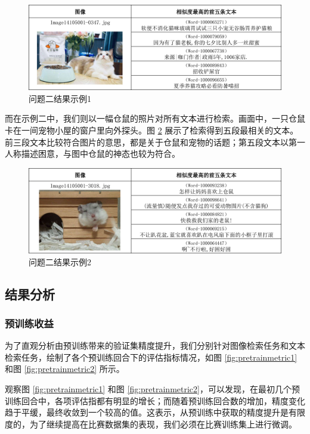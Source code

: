 \documentclass[a4paper]{zreport}
\begin{document}
\begin{figure}[h]
\centering
\includegraphics[width=1.\linewidth]{figures/example21}
\caption{问题二结果示例1}
\label{fig:example21}
\end{figure}

而在示例二中，我们则以一幅仓鼠的照片对所有文本进行检索。画面中，一只仓鼠卡在一间宠物小屋的窗户里向外探头。图 \ref{fig:example22} 展示了检索得到五段最相关的文本。前三段文本比较符合图片的意思，都是关于仓鼠和宠物的话题；第五段文本以第一人称描述困意，与图中仓鼠的神态也较为符合。


\begin{figure}[h]
\centering
\includegraphics[width=1.\linewidth]{figures/example22}
\caption{问题二结果示例2}
\label{fig:example22}
\end{figure}


\subsection{结果分析}

\subsubsection{预训练收益}

为了直观分析由预训练带来的验证集精度提升，我们分别针对图像检索任务和文本检索任务，绘制了各个预训练回合下的评估指标情况，如图 \ref{fig:pretrainmetric1} 和图 \ref{fig:pretrainmetric2} 所示。

观察图 \ref{fig:pretrainmetric1} 和图 \ref{fig:pretrainmetric2}，可以发现，在最初几个预训练回合中，各项评估指都有明显的增长；而随着预训练回合数的增加，精度变化趋于平缓，最终收敛到一个较高的值。这表示，从预训练中获取的精度提升是有限度的，为了继续提高在比赛数据集的表现，我们必须在比赛训练集上进行微调。
\end{document}
